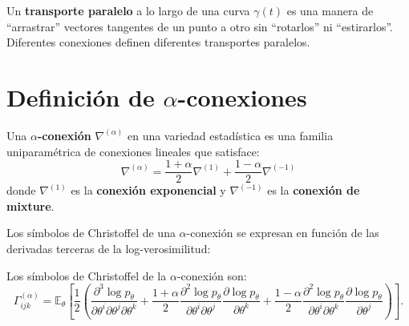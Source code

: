 \begin{definition}
	Un \textbf{transporte paralelo} a lo largo de una curva $\gamma(t)$ es una manera de ``arrastrar'' vectores tangentes de un punto a otro sin ``rotarlos'' ni ``estirarlos''.  Diferentes conexiones definen diferentes transportes paralelos.
\end{definition}

\begin{center}
\end{center}

\section[Definición de $\alpha$-conexiones]{Definición de $\alpha$-conexiones}

\begin{definition}
	Una \textbf{$\alpha$-conexión} $\nabla^{(\alpha)}$ en una variedad estadística es una familia uniparamétrica de conexiones lineales que satisface:
	\[
	\nabla^{(\alpha)} = \frac{1+\alpha}{2} \nabla^{(1)} + \frac{1-\alpha}{2} \nabla^{(-1)}
	\]
	donde $\nabla^{(1)}$ es la \textbf{conexión exponencial} y $\nabla^{(-1)}$ es la \textbf{conexión de mixture}.
\end{definition}

Los símbolos de Christoffel de una $\alpha$-conexión se expresan en función de las derivadas terceras de la log-verosimilitud:

\begin{definition}
	Los símbolos de Christoffel de la $\alpha$-conexión son:
	\[
	\Gamma^{(\alpha)}_{ijk} = \mathbb{E}_\theta\!\left[\frac{1}{2}\left(\frac{\partial^3 \log p_\theta}{\partial\theta^i \partial\theta^j \partial\theta^k}
	+ \frac{1+\alpha}{2} \frac{\partial^2 \log p_\theta}{\partial\theta^i \partial\theta^j}\frac{\partial \log p_\theta}{\partial\theta^k}
	+ \frac{1-\alpha}{2} \frac{\partial^2 \log p_\theta}{\partial\theta^i \partial\theta^k}\frac{\partial \log p_\theta}{\partial\theta^j}\right)\right].
	\]
\end{definition}

